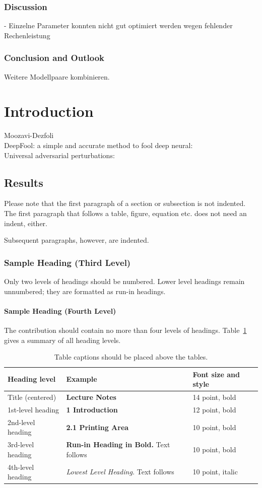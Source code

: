 \documentclass[runningheads]{llncs}
\begin{document}
\subsubsection{Discussion}
- Einzelne Parameter konnten nicht gut optimiert werden wegen fehlender Rechenleistung
\subsubsection{Conclusion and Outlook}
Weitere Modellpaare kombinieren.


\section{Introduction}
Moozavi-Dezfoli\cite{fawzi_robustness_2017}\\
DeepFool: a simple and accurate method to fool deep neural:\cite{moosavi-dezfooli_deepfool_2016}\\
Universal adversarial perturbations:\cite{moosavi-dezfooli_universal_2017}
\subsection{Results}
Please note that the first paragraph of a section or subsection is
not indented. The first paragraph that follows a table, figure,
equation etc. does not need an indent, either.

Subsequent paragraphs, however, are indented.

\subsubsection{Sample Heading (Third Level)} Only two levels of
headings should be numbered. Lower level headings remain unnumbered;
they are formatted as run-in headings.

\paragraph{Sample Heading (Fourth Level)}
The contribution should contain no more than four levels of
headings. Table~\ref{tab1} gives a summary of all heading levels.

\begin{table}
\caption{Table captions should be placed above the
tables.}\label{tab1}
\begin{tabular}{|l|l|l|}
\hline
Heading level &  Example & Font size and style\\
\hline
Title (centered) &  {\Large\bfseries Lecture Notes} & 14 point, bold\\
1st-level heading &  {\large\bfseries 1 Introduction} & 12 point, bold\\
2nd-level heading & {\bfseries 2.1 Printing Area} & 10 point, bold\\
3rd-level heading & {\bfseries Run-in Heading in Bold.} Text follows & 10 point, bold\\
4th-level heading & {\itshape Lowest Level Heading.} Text follows & 10 point, italic\\
\hline
\end{tabular}
\end{table}
\end{document}
